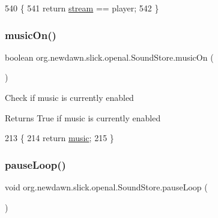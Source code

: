\begin{DoxyCode}
540                                                  \{
541         \textcolor{keywordflow}{return} \mbox{\hyperlink{classorg_1_1newdawn_1_1slick_1_1openal_1_1_sound_store_a3529a80a2ca84a63d3bdc55194f52ac7}{stream}} == player;
542     \}
\end{DoxyCode}
\mbox{\label{classorg_1_1newdawn_1_1slick_1_1openal_1_1_sound_store_adcedd31c54dcfb04bfb1f546d6ee17dd}} 
\subsubsection{\texorpdfstring{music\+On()}{musicOn()}}
{\footnotesize\ttfamily boolean org.\+newdawn.\+slick.\+openal.\+Sound\+Store.\+music\+On (\begin{DoxyParamCaption}{ }\end{DoxyParamCaption})\hspace{0.3cm}{\ttfamily [inline]}}

Check if music is currently enabled

\begin{DoxyReturn}{Returns}
True if music is currently enabled 
\end{DoxyReturn}

\begin{DoxyCode}
213                              \{
214         \textcolor{keywordflow}{return} \mbox{\hyperlink{classorg_1_1newdawn_1_1slick_1_1openal_1_1_sound_store_a7e15ee371935f6d530e4481ac9e2bd7e}{music}};
215     \}
\end{DoxyCode}
\mbox{\label{classorg_1_1newdawn_1_1slick_1_1openal_1_1_sound_store_af8650bad0ed902a74410a079a5df9098}} 
\subsubsection{\texorpdfstring{pause\+Loop()}{pauseLoop()}}
{\footnotesize\ttfamily void org.\+newdawn.\+slick.\+openal.\+Sound\+Store.\+pause\+Loop (\begin{DoxyParamCaption}{ }\end{DoxyParamCaption})\hspace{0.3cm}{\ttfamily [inline]}}

